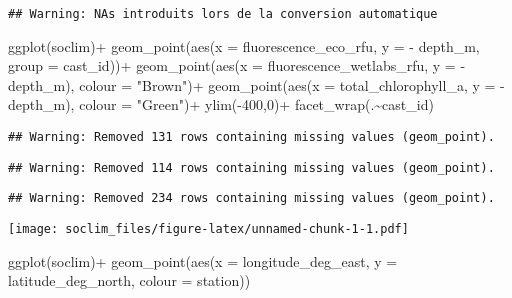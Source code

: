 \documentclass[
]{article}
\newenvironment{Shaded}{\begin{snugshade}}{\end{snugshade}}
\newcommand{\AttributeTok}[1]{\textcolor[rgb]{0.77,0.63,0.00}{#1}}
\newcommand{\DecValTok}[1]{\textcolor[rgb]{0.00,0.00,0.81}{#1}}
\newcommand{\FunctionTok}[1]{\textcolor[rgb]{0.00,0.00,0.00}{#1}}
\newcommand{\NormalTok}[1]{#1}
\newcommand{\SpecialCharTok}[1]{\textcolor[rgb]{0.00,0.00,0.00}{#1}}
\newcommand{\StringTok}[1]{\textcolor[rgb]{0.31,0.60,0.02}{#1}}
\begin{document}
\begin{verbatim}
## Warning: NAs introduits lors de la conversion automatique
\end{verbatim}

\begin{Shaded}
\begin{Highlighting}[]
\FunctionTok{ggplot}\NormalTok{(soclim)}\SpecialCharTok{+}
  \FunctionTok{geom\_point}\NormalTok{(}\FunctionTok{aes}\NormalTok{(}\AttributeTok{x =}\NormalTok{ fluorescence\_eco\_rfu, }\AttributeTok{y =} \SpecialCharTok{{-}}\NormalTok{ depth\_m, }\AttributeTok{group =}\NormalTok{ cast\_id))}\SpecialCharTok{+}
  \FunctionTok{geom\_point}\NormalTok{(}\FunctionTok{aes}\NormalTok{(}\AttributeTok{x =}\NormalTok{ fluorescence\_wetlabs\_rfu, }\AttributeTok{y =} \SpecialCharTok{{-}}\NormalTok{ depth\_m), }\AttributeTok{colour =} \StringTok{"Brown"}\NormalTok{)}\SpecialCharTok{+}
  \FunctionTok{geom\_point}\NormalTok{(}\FunctionTok{aes}\NormalTok{(}\AttributeTok{x =}\NormalTok{ total\_chlorophyll\_a, }\AttributeTok{y =} \SpecialCharTok{{-}}\NormalTok{depth\_m), }\AttributeTok{colour =} \StringTok{"Green"}\NormalTok{)}\SpecialCharTok{+}
  \FunctionTok{ylim}\NormalTok{(}\SpecialCharTok{{-}}\DecValTok{400}\NormalTok{,}\DecValTok{0}\NormalTok{)}\SpecialCharTok{+}
  \FunctionTok{facet\_wrap}\NormalTok{(.}\SpecialCharTok{\textasciitilde{}}\NormalTok{cast\_id)}
\end{Highlighting}
\end{Shaded}

\begin{verbatim}
## Warning: Removed 131 rows containing missing values (geom_point).
\end{verbatim}

\begin{verbatim}
## Warning: Removed 114 rows containing missing values (geom_point).
\end{verbatim}

\begin{verbatim}
## Warning: Removed 234 rows containing missing values (geom_point).
\end{verbatim}

\texttt{[image: soclim\_files/figure-latex/unnamed-chunk-1-1.pdf]}

\begin{Shaded}
\begin{Highlighting}[]
\FunctionTok{ggplot}\NormalTok{(soclim)}\SpecialCharTok{+}
  \FunctionTok{geom\_point}\NormalTok{(}\FunctionTok{aes}\NormalTok{(}\AttributeTok{x =}\NormalTok{ longitude\_deg\_east, }\AttributeTok{y =}\NormalTok{ latitude\_deg\_north, }\AttributeTok{colour =}\NormalTok{ station))}
\end{Highlighting}
\end{Shaded}
\end{document}
